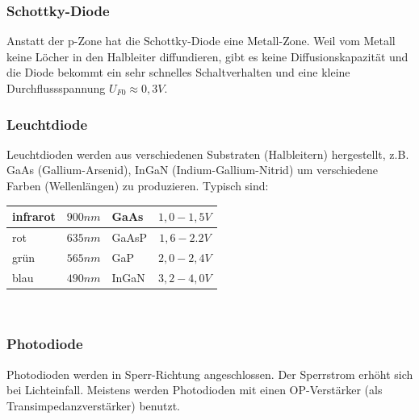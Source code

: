 		\subsubsection{Schottky-Diode}
			Anstatt der p-Zone hat die Schottky-Diode eine Metall-Zone. Weil vom Metall
			keine Löcher in den Halbleiter diffundieren, gibt es keine Diffusionskapazität
			und die Diode bekommt ein sehr schnelles Schaltverhalten und eine kleine
			Durchflussspannung $U_{F0} \approx 0,3V$. \\
			
		\subsubsection{Leuchtdiode}
			Leuchtdioden werden aus verschiedenen Substraten (Halbleitern) hergestellt,
			z.B. GaAs (Gallium-Arsenid), InGaN (Indium-Gallium-Nitrid) um verschiedene
			Farben (Wellenlängen) zu produzieren. Typisch sind: \\
			\begin{tabular}{|l|l|l|c|} \hline
				infrarot & $900nm$ & GaAs & $1,0-1,5V$ \\ \hline
				rot & $635nm$ & GaAsP & $1,6-2.2V$ \\ \hline
				grün & $565nm$ & GaP & $2,0-2,4V$ \\ \hline
				blau & $490nm$ & InGaN & $3,2-4,0V$ \\ \hline
			\end{tabular}\\
			
		\subsubsection{Photodiode}
			Photodioden werden in Sperr-Richtung angeschlossen. Der Sperrstrom erhöht sich
			bei Lichteinfall. Meistens werden Photodioden mit einen OP-Verstärker (als
			Transimpedanzverstärker) benutzt. \\
